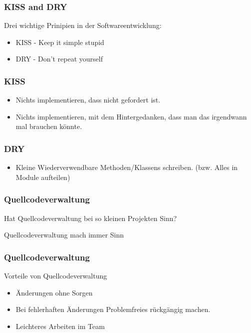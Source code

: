 \documentclass{beamer}
\begin{document}
\begin{frame}[<+->]\frametitle{KISS and DRY}
    \pause
    Drei wichtige Prinipien in der Softwareentwicklung:
	\pause
    \begin{itemize}
    	\item KISS - Keep it simple stupid
    	\item DRY - Don't repeat yourself
	\end{itemize}

\end{frame}

\begin{frame}[<+->]\frametitle{KISS}
    \pause
    \begin{itemize}
    	\item Nichts implementieren, dass nicht gefordert ist.
    	\item Nichts implementieren, mit dem Hintergedanken, dass man das irgendwann mal brauchen könnte.
    \end{itemize}
\end{frame}

\begin{frame}[<+->]\frametitle{DRY}
    \pause
    \begin{itemize}
    	\item Kleine Wiederverwendbare Methoden/Klassens schreiben. (bzw. Alles in Module aufteilen)
    \end{itemize}
\end{frame}

\begin{frame}[<+->]\frametitle{Quellcodeverwaltung}
    \pause
    Hat Quellcodeverwaltung bei so kleinen Projekten Sinn?
    \pause
    \begin{exampleblock}{}
    	Quellcodeverwaltung mach immer Sinn
    \end{exampleblock}
\end{frame}

\begin{frame}[<+->]\frametitle{Quellcodeverwaltung}
    \pause
    Vorteile von Quellcodeverwaltung
    \pause
    \begin{itemize}
    	\item Änderungen ohne Sorgen
    	\item Bei fehlerhaften Änderungen Problemfreies rückgängig machen.
    	\item Leichteres Arbeiten im Team
    \end{itemize}
\end{frame}
\end{document}
